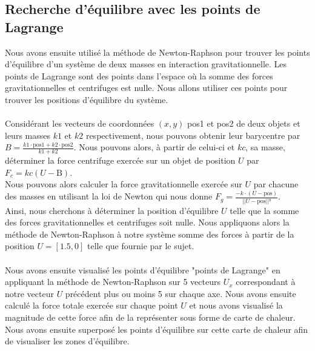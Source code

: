 \documentclass{article}
\begin{document}
\subsection{Recherche d'équilibre avec les points de Lagrange}
\label{sec:lagrange}
Nous avons ensuite utilisé la méthode de Newton-Raphson pour trouver les points d'équilibre d'un système de deux masses en interaction gravitationnelle. Les points de Lagrange sont des points dans l'espace où la somme des forces gravitationnelles et centrifuges est nulle. Nous allons utiliser ces points pour trouver les positions d'équilibre du système. \\ \\
Considérant les vecteurs de coordonnées \((x, y)\) pos1 et pos2 de deux objets et leurs masses \(k1\) et \(k2\) respectivement, nous pouvons obtenir leur barycentre par \(B = \frac{k1 \cdot \text{pos1} + k2 \cdot \text{pos2}}{k1 + k2}\). Nous pouvons alors, à partir de celui-ci et \(kc\), sa masse, déterminer la force centrifuge exercée sur un objet de position \(U\) par \(F_c = kc(U - \text{B})\). \\
Nous pouvons alors calculer la force gravitationnelle exercée sur \(U\) par chacune des masses en utilisant la loi de Newton qui nous donne \(F_g = \frac{-k \cdot (U - \text{pos})}{||U - \text{pos}||³}\). \\ 

Ainsi, nous cherchons à déterminer la position d'équilibre \(U\) telle que la somme des forces gravitationnelles et centrifuges soit nulle. Nous appliquons alors la méthode de Newton-Raphson à notre système somme des forces à partir de la position \(U = [1.5,0]\) telle que fournie par le sujet. \\ \\

Nous avons ensuite visualisé les points d'équilibre "points de Lagrange" en appliquant la méthode de Newton-Raphson sur 5 vecteurs \(U_x\) correspondant à notre vecteur \(U\) précédent plus ou moins 5 sur chaque axe. Nous avons ensuite calculé la force totale exercée sur chaque point \(U\) et nous avons visualisé la magnitude de cette force afin de la représenter sous forme de carte de chaleur. Nous avons ensuite superposé les points d'équilibre sur cette carte de chaleur afin de visualiser les zones d'équilibre.
\end{document}
